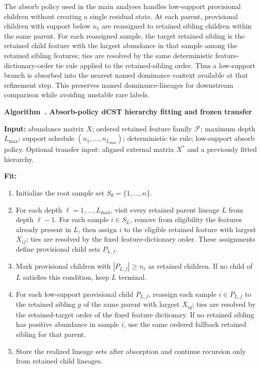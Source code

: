 \documentclass[11pt]{article}
\newcounter{algorithm}
\newcommand{\algorithmtitle}[1]{%
  \refstepcounter{algorithm}%
  \noindent\textbf{Algorithm~\thealgorithm. #1}\par\nobreak\smallskip}
\begin{document}
The absorb policy used in the main analyses handles low-support provisional
children without creating a single residual state. At each parent, provisional
children with support below \(n_\ell\) are reassigned to retained sibling
children within the same parent. For each reassigned sample, the target retained
sibling is the retained child feature with the largest abundance in that sample
among the retained sibling features; ties are resolved by the same deterministic
feature-dictionary-order tie rule applied to the retained-sibling order. Thus
a low-support branch is absorbed into the nearest named dominance context
available at that refinement step. This preserves named dominance-lineages
for downstream comparison while avoiding unstable rare labels.

\newpage
\begin{samepage}
\algorithmtitle{Absorb-policy dCST hierarchy fitting and frozen transfer}
\label{alg:dcst-fit-transfer}
\begin{minipage}{\linewidth}
\small
\textbf{Input:} abundance matrix \(X\); ordered retained feature family
\(\mathcal{F}\); maximum depth \(L_{\max}\); support schedule
\((n_1,\ldots,n_{L_{\max}})\); deterministic tie rule; low-support absorb
policy. Optional transfer input: aligned external matrix \(X^{\ast}\) and a
previously fitted hierarchy.

\textbf{Fit:}
\begin{enumerate}
\item Initialize the root sample set \(S_{\emptyset}=\{1,\ldots,n\}\).
\item For each depth \(\ell=1,\ldots,L_{\max}\), visit every retained parent
lineage \(L\) from depth \(\ell-1\). For each sample \(i\in S_L\), remove from
eligibility the features already present in \(L\), then assign \(i\) to the
eligible retained feature with largest \(X_{if}\); ties are resolved by the
fixed feature-dictionary order. These assignments define provisional child
sets \(P_{L,f}\).
\item Mark provisional children with \(|P_{L,f}|\ge n_\ell\) as retained
children. If no child of \(L\) satisfies this condition, keep \(L\) terminal.
\item For each low-support provisional child \(P_{L,f}\), reassign each
sample \(i\in P_{L,f}\) to the retained sibling \(g\) of the same parent with
largest \(X_{ig}\); ties are resolved by the retained-target order of the
fixed feature dictionary. If no retained sibling has positive abundance in sample \(i\),
use the same ordered fallback retained sibling for that parent.
\item Store the realized lineage sets after absorption and continue recursion
only from retained child lineages.
\end{enumerate}


\end{minipage}
\end{samepage}
\end{document}
